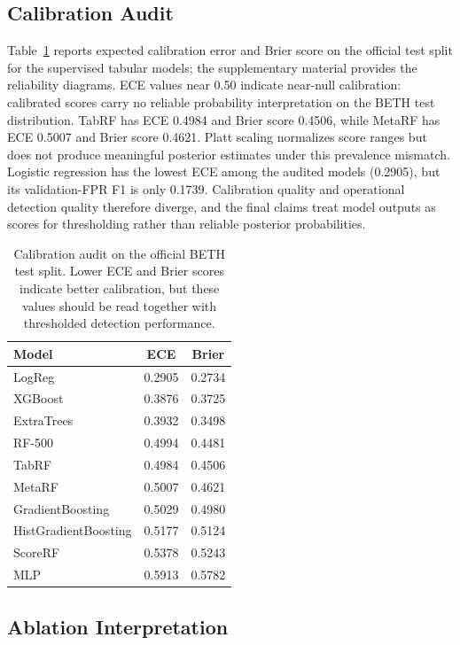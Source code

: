 \documentclass[10pt,journal,compsoc]{IEEEtran}
\begin{document}
\subsection{Calibration Audit}

Table~\ref{tab:calibration_audit} reports expected calibration error and Brier score on the official test split for the supervised tabular models; the supplementary material provides the reliability diagrams. ECE values near 0.50 indicate near-null calibration: calibrated scores carry no reliable probability interpretation on the BETH test distribution. TabRF has ECE 0.4984 and Brier score 0.4506, while MetaRF has ECE 0.5007 and Brier score 0.4621. Platt scaling normalizes score ranges but does not produce meaningful posterior estimates under this prevalence mismatch. Logistic regression has the lowest ECE among the audited models (0.2905), but its validation-FPR F1 is only 0.1739. Calibration quality and operational detection quality therefore diverge, and the final claims treat model outputs as scores for thresholding rather than reliable posterior probabilities.

\begin{table}[t]
\centering
\caption{Calibration audit on the official BETH test split. Lower ECE and Brier scores indicate better calibration, but these values should be read together with thresholded detection performance.}
\label{tab:calibration_audit}
\begin{tabular}{lcc}
\toprule
\textbf{Model} & \textbf{ECE} & \textbf{Brier} \\
\midrule
LogReg & 0.2905 & 0.2734 \\
XGBoost & 0.3876 & 0.3725 \\
ExtraTrees & 0.3932 & 0.3498 \\
RF-500 & 0.4994 & 0.4481 \\
TabRF & 0.4984 & 0.4506 \\
MetaRF & 0.5007 & 0.4621 \\
GradientBoosting & 0.5029 & 0.4980 \\
HistGradientBoosting & 0.5177 & 0.5124 \\
ScoreRF & 0.5378 & 0.5243 \\
MLP & 0.5913 & 0.5782 \\
\bottomrule
\end{tabular}
\end{table}

\subsection{Ablation Interpretation}
\end{document}
